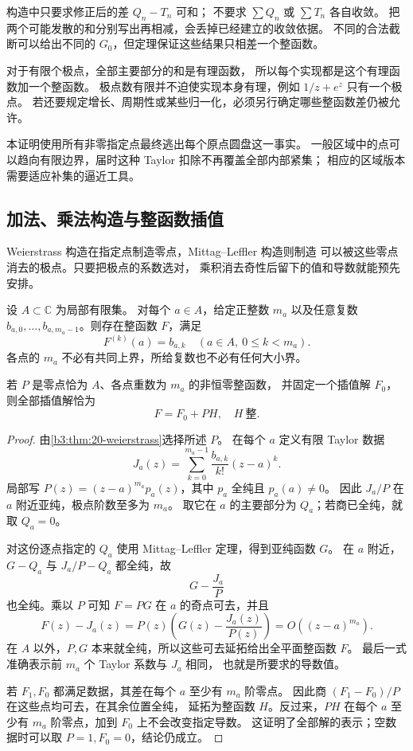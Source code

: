 构造中只要求修正后的差 \(Q_n-T_n\) 可和；
不要求 \(\sum Q_n\) 或 \(\sum T_n\) 各自收敛。
把两个可能发散的和分别写出再相减，会丢掉已经建立的收敛依据。
不同的合法截断可以给出不同的 \(G_0\)，但定理保证这些结果只相差一个整函数。

\ProseParagraphBreak
对于有限个极点，全部主要部分的和是有理函数，
所以每个实现都是这个有理函数加一个整函数。
极点数有限并不迫使实现本身有理，例如 \(1/z+e^z\) 只有一个极点。
若还要规定增长、周期性或某些归一化，必须另行确定哪些整函数差仍被允许。

\ProseParagraphBreak
本证明使用所有非零指定点最终逃出每个原点圆盘这一事实。
一般区域中的点可以趋向有限边界，届时这种 Taylor 扣除不再覆盖全部内部紧集；
相应的区域版本需要适应补集的逼近工具。

\subsection{加法、乘法构造与整函数插值}
\label{b3:subsec:200404}

Weierstrass 构造在指定点制造零点，Mittag–Leffler 构造则制造
可以被这些零点消去的极点。只要把极点的系数选对，
乘积消去奇性后留下的值和导数就能预先安排。

\begin{theorem}[离散集上的整函数插值]\label{b3:thm:20-entire-interpolation}
设 \(A\subset\mathbb C\) 为局部有限集。
对每个 \(a\in A\)，给定正整数 \(m_a\) 以及任意复数
\(b_{a,0},\ldots,b_{a,m_a-1}\)。则存在整函数 \(F\)，满足
\[
 F^{(k)}(a)=b_{a,k}
 \quad(a\in A,\ 0\le k<m_a).
\]
各点的 \(m_a\) 不必有共同上界，所给复数也不必有任何大小界。

\ProseParagraphBreak
若 \(P\) 是零点恰为 \(A\)、各点重数为 \(m_a\) 的非恒零整函数，
并固定一个插值解 \(F_0\)，则全部插值解恰为
\[
 F=F_0+P H,\quad H\ \text{整}.
\]
\end{theorem}
\begin{proof}
由\cref{b3:thm:20-weierstrass}选择所述 \(P\)。
在每个 \(a\) 定义有限 Taylor 数据
\[
 J_a(z)=\sum_{k=0}^{m_a-1}\frac{b_{a,k}}{k!}(z-a)^k.
\]
局部写 \(P(z)=(z-a)^{m_a}p_a(z)\)，其中 \(p_a\) 全纯且 \(p_a(a)\ne0\)。
因此 \(J_a/P\) 在 \(a\) 附近亚纯，极点阶数至多为 \(m_a\)。
取它在 \(a\) 的主要部分为 \(Q_a\)；若商已全纯，就取 \(Q_a=0\)。

对这份逐点指定的 \(Q_a\) 使用 Mittag–Leffler 定理，得到亚纯函数 \(G\)。
在 \(a\) 附近，\(G-Q_a\) 与 \(J_a/P-Q_a\) 都全纯，故
\[
 G-\frac{J_a}{P}
\]
也全纯。乘以 \(P\) 可知 \(F=PG\) 在 \(a\) 的奇点可去，并且
\[
 F(z)-J_a(z)
 =P(z)\left(G(z)-\frac{J_a(z)}{P(z)}\right)
 =O((z-a)^{m_a}).
\]
在 \(A\) 以外，\(P,G\) 本来就全纯，所以这些可去延拓给出全平面整函数 \(F\)。
最后一式准确表示前 \(m_a\) 个 Taylor 系数与 \(J_a\) 相同，
也就是所要求的导数值。

若 \(F_1,F_0\) 都满足数据，其差在每个 \(a\) 至少有 \(m_a\) 阶零点。
因此商 \((F_1-F_0)/P\) 在这些点均可去，在其余位置全纯，
延拓为整函数 \(H\)。反过来，\(PH\) 在每个 \(a\) 至少有
\(m_a\) 阶零点，加到 \(F_0\) 上不会改变指定导数。
这证明了全部解的表示；空数据时可以取 \(P=1,F_0=0\)，结论仍成立。
\end{proof}

